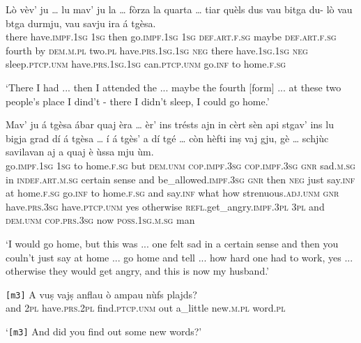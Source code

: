 \begin{linenumbers}
	\gll Lò vèv’ ju … lu mav’ ju la …  fòrza la quarta … tiar quèls dus vau bitga du- lò vau btga durmju, vau savju ira á tgèsa.\\
	there have.\textsc{impf.1sg} \textsc{1sg} {} then go.\textsc{impf.1sg} \textsc{1sg} \textsc{def.art.f.sg} {} maybe \textsc{def.art.f.sg} fourth {} by \textsc{dem.m.pl} two.\textsc{pl} have.\textsc{prs.1sg.1sg} \textsc{neg} {} there have.\textsc{1sg.1sg} \textsc{neg} sleep.\textsc{ptcp.unm} have.\textsc{prs.1sg.1sg} can.\textsc{ptcp.unm} go.\textsc{inf} to home.\textsc{f.sg}\\
\end{linenumbers}
\medskip
\glt `There I had ... then I attended the ... maybe the fourth [form] ... at these two people's place I dind't - there I didn't sleep, I could go home.'
\medskip

\begin{linenumbers}
	\gll  Mav’ ju á tgèsa ábar quaj èra … èr’ ins trésts ajn in cèrt sèn api stgav’ ins lu bigja grad dí á tgèsa … í á tgès’ a dí tgé … còn hèfti inṣ vaj gju, gè … schjùc savilavan aj a quaj è ùssa mju ùm.\\
	go.\textsc{impf.1sg} \textsc{1sg} to home.\textsc{f.sg} but \textsc{dem.unm} \textsc{cop.impf.3sg} {} \textsc{cop.impf.3sg} \textsc{gnr} sad.\textsc{m.sg} in \textsc{indef.art.m.sg} certain sense and be\_allowed.\textsc{impf.3sg} \textsc{gnr} then \textsc{neg} just say.\textsc{inf} at home.\textsc{f.sg} {} go.\textsc{inf} to home.\textsc{f.sg} and say.\textsc{inf} what {} how strenuous.\textsc{adj.unm} \textsc{gnr} have.\textsc{prs.3sg} have.\textsc{ptcp.unm} yes {} otherwise \textsc{refl}.get\_angry.\textsc{impf.3pl} \textsc{3pl} and \textsc{dem.unm} \textsc{cop.prs.3sg} now \textsc{poss.1sg.m.sg} man\\
\end{linenumbers}
\medskip
\glt `I would go home, but this was ... one felt sad in a certain sense and then you couln't just say at home ... go home and tell ... how hard one had to work, yes ... otherwise they would get angry, and this is now my husband.'
\medskip

\begin{linenumbers}
	\gll \texttt{[m3]} A vuṣ vajṣ anflau ò ampau nùfs plajds?    \\
	{} and \textsc{2pl} have.\textsc{prs.2pl} find.\textsc{ptcp.unm} out a\_little new.\textsc{m.pl} word.\textsc{pl}\\
\end{linenumbers}
\medskip
\glt `\texttt{[m3]} And did you find out some new words?'
\medskip

